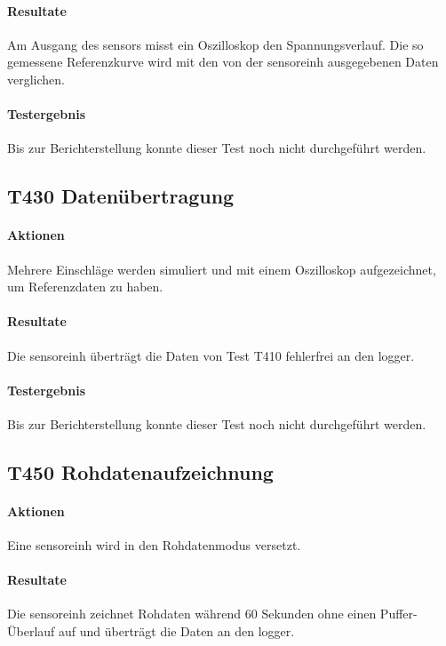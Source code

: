 \paragraph{Resultate} Am Ausgang des \gls{sensor}s misst ein Oszilloskop den Spannungsverlauf. Die so gemessene Referenzkurve wird mit den von der \gls{sensoreinh} ausgegebenen Daten verglichen.

\paragraph{Testergebnis} Bis zur Berichterstellung konnte dieser Test noch nicht durchgeführt werden.

\subsection{T430 Datenübertragung}
\paragraph{Aktionen} Mehrere Einschläge werden simuliert und mit einem Oszilloskop aufgezeichnet, um Referenzdaten zu haben.

\paragraph{Resultate} Die \gls{sensoreinh} überträgt die Daten von Test T410 fehlerfrei an den \gls{logger}.

\paragraph{Testergebnis} Bis zur Berichterstellung konnte dieser Test noch nicht durchgeführt werden.

\subsection{T450 Rohdatenaufzeichnung}
\paragraph{Aktionen} Eine \gls{sensoreinh} wird in den Rohdatenmodus versetzt.

\paragraph{Resultate} Die \gls{sensoreinh} zeichnet Rohdaten während 60 Sekunden ohne einen Puffer-Überlauf auf und überträgt die Daten an den \gls{logger}.

